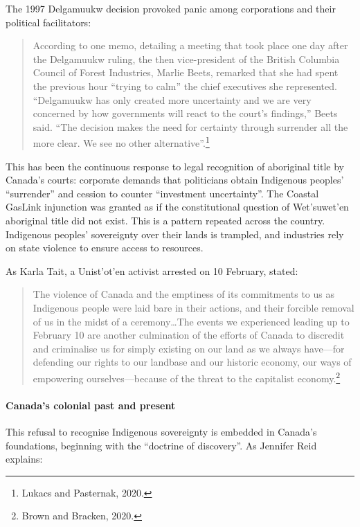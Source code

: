 The 1997 Delgamuukw decision provoked panic among corporations and their political facilitators:

\blockquote{According to one memo, detailing a meeting that took place one day after the Delgamuukw ruling, the then vice-president of the British Columbia Council of Forest Industries, Marlie Beets, remarked that she had spent the previous hour ``trying to calm'' the chief executives she represented. ``Delgamuukw has only created more uncertainty and we are very concerned by how governments will react to the court's findings,'' Beets said. ``The decision makes the need for certainty through surrender all the more clear. We see no other alternative''.\footnote{Lukacs and Pasternak, 2020.}}

This has been the continuous response to legal recognition of aboriginal title by Canada's courts: corporate demands that politicians obtain Indigenous peoples' ``surrender'' and cession to counter ``investment uncertainty''. The Coastal GasLink injunction was granted as if the constitutional question of Wet'suwet'en aboriginal title did not exist. This is a pattern repeated across the country. Indigenous peoples' sovereignty over their lands is trampled, and industries rely on state violence to ensure access to resources.

As Karla Tait, a Unist'ot'en activist arrested on 10 February, stated:

\blockquote{The violence of Canada and the emptiness of its commitments to us as Indigenous people were laid bare in their actions, and their forcible removal of us in the midst of a ceremony\ldots The events we experienced leading up to February 10 are another culmination of the efforts of Canada to discredit and criminalise us for simply existing on our land as we always have---for defending our rights to our landbase and our historic economy, our ways of empowering ourselves---because of the threat to the capitalist economy.\footnote{Brown and Bracken, 2020.}}

\paragraph{Canada's colonial past and present}

This refusal to recognise Indigenous sovereignty is embedded in Canada's foundations, beginning with the ``doctrine of discovery''. As Jennifer Reid explains:

